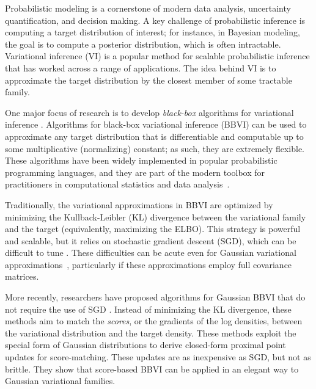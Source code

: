 
%

Probabilistic modeling is a cornerstone of modern data analysis,
uncertainty quantification, and decision making. A key challenge of
probabilistic inference is computing a target distribution of
interest; for instance, in Bayesian modeling, the goal is to compute a
posterior distribution, which is often intractable. Variational
inference (VI) \citep{jordan1999vi,wainwright2008graphical,blei2017vi}
is a popular method for scalable probabilistic inference that has worked across a range of applications. The idea behind VI is to approximate the target distribution by the closest member of some tractable family.

One major focus of research is to develop \textit{black-box} algorithms for variational inference
\citep{ranganath2014black,kingma2013auto,titsias2014doubly,kucukelbir2017automatic,  locatello2018boosting,giordano2023black,wang2022dual,modi2023,cai2024}.
Algorithms for black-box variational inference (BBVI) can be used to approximate any target distribution that is differentiable and computable up to some multiplicative (normalizing) constant; as such, they are extremely flexible. These algorithms have been widely implemented in popular probabilistic programming languages, and they are part of the modern toolbox for practitioners in computational statistics and data analysis~\citep{salvatier2016probabilistic,carpenter2017stan,ge2018turing,bingham2019pyro,abril2023pymc}.


Traditionally, the variational approximations in BBVI
are optimized by minimizing the Kullback-Leibler (KL)
divergence between the variational family and the target
(equivalently, maximizing the ELBO).
This strategy is powerful and
scalable, but it relies on stochastic gradient descent (SGD), which can be
difficult to tune
\citep{dhaka2020robust,dhaka2021challenges,zhang2022pathfinder}.
These difficulties can be acute even for Gaussian variational approximations~\citep{ranganath2014black,kucukelbir2017automatic}, particularly if these approximations employ full covariance matrices.

More recently, researchers have proposed algorithms for Gaussian BBVI that
do not require the use of SGD \citep{modi2023,cai2024}. Instead of minimizing the KL divergence, these methods aim to match the \emph{scores}, or the gradients of the log densities,
between the variational distribution and the target density. These methods exploit the special form of Gaussian distributions to derive closed-form proximal point
updates for score-matching. These updates are as inexpensive as SGD, but not as brittle. They show that score-based BBVI can be applied in an elegant way to Gaussian variational families.


